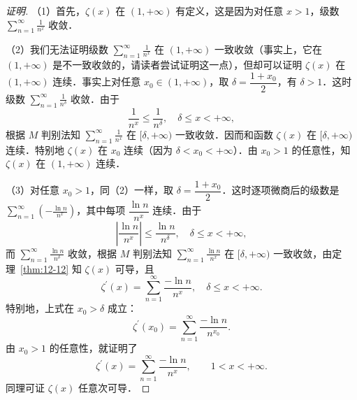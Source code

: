 \begin{proof}[证明]
（1）首先，$\zeta(x)$ 在 $(1,+\infty)$ 有定义，这是因为对任意 $x>1$，级数 $\displaystyle\sum_{n=1}^{\infty}\frac{1}{n^{x}}$ 收敛．

（2）我们无法证明级数 $\displaystyle\sum_{n=1}^{\infty}\frac{1}{n^{x}}$ 在 $(1,+\infty)$ 一致收敛（事实上，它在 $(1,+\infty)$ 是不一致收敛的，请读者尝试证明这一点），但却可以证明 $\zeta(x)$ 在 $(1,+\infty)$ 连续．事实上对任意 $x_{0}\in(1,+\infty)$，取 $\delta=\dfrac{1+x_{0}}{2}$，有 $\delta>1$．这时级数 $\displaystyle\sum_{n=1}^{\infty}\frac{1}{n^{\delta}}$ 收敛．由于
\[
\frac{1}{n^{x}}\leqslant\frac{1}{n^{\delta}},\quad\delta\leqslant x<+\infty,
\]
根据 $M$ 判别法知 $\displaystyle\sum_{n=1}^{\infty}\frac{1}{n^{x}}$ 在 $[\delta,+\infty)$ 一致收敛．因而和函数 $\zeta(x)$ 在 $[\delta,+\infty)$ 连续．特别地 $\zeta(x)$ 在 $x_{0}$ 连续（因为 $\delta<x_{0}<+\infty$）．由 $x_{0}>1$ 的任意性，知 $\zeta(x)$ 在 $(1,+\infty)$ 连续．

（3）对任意 $x_{0}>1$，同（2）一样，取 $\delta=\dfrac{1+x_{0}}{2}$．这时逐项微商后的级数是 $\displaystyle\sum_{n=1}^{\infty}\left(-\frac{\ln n}{n^{x}}\right)$，其中每项 $\dfrac{\ln n}{n^{x}}$ 连续．由于
\[
\left|\frac{\ln n}{n^{x}}\right|\leqslant\frac{\ln n}{n^{\delta}},\quad\delta\leqslant x<+\infty,
\]
而 $\displaystyle\sum_{n=1}^{\infty}\frac{\ln n}{n^{\delta}}$ 收敛，根据 $M$ 判别法知 $\displaystyle\sum_{n=1}^{\infty}\frac{\ln n}{n^{x}}$ 在 $[\delta,+\infty)$ 一致收敛，由定理~\ref{thm:12-12} 知 $\zeta(x)$ 可导，且
\[
\zeta^{\prime}(x)=\sum_{n=1}^{\infty}\frac{-\ln n}{n^{x}},\quad\delta\leqslant x<+\infty.
\]
特别地，上式在 $x_{0}>\delta$ 成立：
\[
\zeta^{\prime}(x_{0})=\sum_{n=1}^{\infty}\frac{-\ln n}{n^{x_{0}}}.
\]
由 $x_{0}>1$ 的任意性，就证明了
\[
\zeta^{\prime}(x)=\sum_{n=1}^{\infty}\frac{-\ln n}{n^{x}},\qquad 1<x<+\infty.
\]
同理可证 $\zeta(x)$ 任意次可导．
\end{proof}

